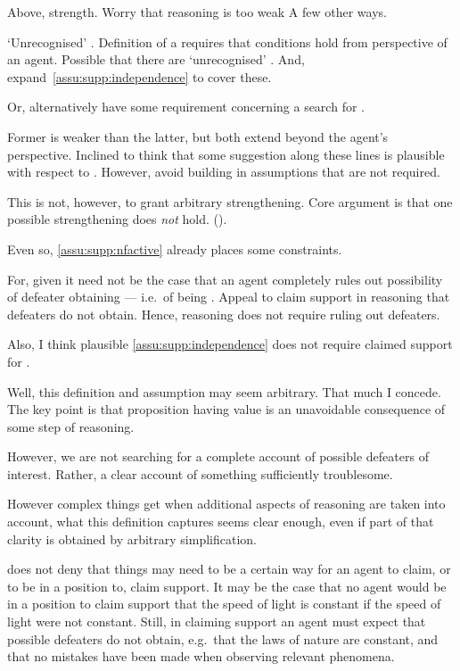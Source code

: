 \begin{note}
  Above, strength.
  Worry that reasoning is too weak
  A few other ways.

  `Unrecognised' .
  Definition of a \requ{} requires that conditions hold from perspective of an agent.
  Possible that there are `unrecognised' .
  And, expand~\autoref{assu:supp:independence} to cover these.

  Or, alternatively have some requirement concerning a search for .

  Former is weaker than the latter, but both extend beyond the agent's perspective.
  Inclined to think that some suggestion along these lines is plausible with respect to \ideaCSB{}.
  However, avoid building in assumptions that are not required.

  This is not, however, to grant arbitrary strengthening.
  Core argument is that one possible strengthening does \emph{not} hold. (\ESU{}).
\end{note}

\begin{note}
  Even so, \ref{assu:supp:nfactive} already places some constraints.

  For, given \nfcs{} it need not be the case that an agent completely rules out possibility of defeater obtaining --- i.e.\ of being \mom{}.
  Appeal to claim support in reasoning that defeaters do not obtain.
  Hence, reasoning does not require ruling out defeaters.

  Also, I think plausible \autoref{assu:supp:independence} does not require claimed support for .
\end{note}

\begin{note}
  Well, this definition and assumption may seem arbitrary.
  That much I concede.
  The key point is that proposition having value is an unavoidable consequence of some step of reasoning.

  However, we are not searching for a complete account of possible defeaters of interest.
  Rather, a clear account of something sufficiently troublesome.

  However complex things get when additional aspects of reasoning are taken into account, what this definition captures seems clear enough, even if part of that clarity is obtained by arbitrary simplification.
\end{note}

\begin{note}
  \eiS{} does not deny that things may need to be a certain way for an agent to claim, or to be in a position to, claim support.
  It may be the case that no agent would be in a position to claim support that the speed of light is constant if the speed of light were not constant.
  Still, in claiming support an agent must expect that possible defeaters do not obtain, e.g.\ that the laws of nature are constant, and that no mistakes have been made when observing relevant phenomena.
\end{note}

